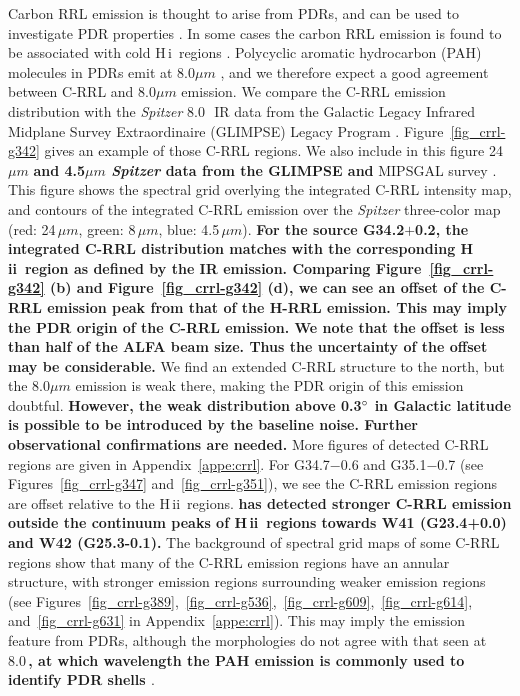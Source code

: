 \documentclass[manuscript]{aastex61}
\newcommand{\hii}{{\rm H\,}{{\sc ii}}}
\newcommand{\hi}{{\rm H\,}{{\sc i}}}
\newcommand{\um}{\mu m}
\begin{document}
Carbon RRL emission is thought to arise from PDRs, and can be used to investigate PDR properties \citep[][etc.]{Pankonin1977,Natta1994,Roshi2007}.
In some cases the carbon RRL emission is found to be associated with cold \hi\ regions \citep{Roshi2011}.
Polycyclic aromatic hydrocarbon (PAH) molecules in PDRs emit at 8.0$\um$ \citep{Watson2008,Watson2009}, and we therefore expect a good agreement between C-RRL and 8.0$\um$ emission.
We compare the C-RRL emission distribution with the {\it Spitzer} 8.0\,\micron\ IR data from the Galactic Legacy Infrared Midplane Survey Extraordinaire (GLIMPSE) Legacy Program \citep{Benjamin2003,Churchwell2009}.
Figure~\ref{fig_crrl-g342} gives an example of those C-RRL regions.
We also include in this figure 24$\um$ \textbf{and 4.5$\um$ {\it Spitzer} data from the GLIMPSE and} MIPSGAL survey \citep{Carey2009, Gutermuth2015}.
This figure shows the spectral grid overlying the integrated C-RRL intensity map, and contours of the integrated C-RRL emission over the {\it Spitzer} three-color map (red: 24\,$\um$, green: 8\,$\um$, blue: 4.5\,$\um$).
\textbf{
For the source G34.2$+$0.2, the integrated C-RRL distribution matches with the corresponding \hii\ region as defined by the IR emission.
Comparing Figure~\ref{fig_crrl-g342} (b) and Figure~\ref{fig_crrl-g342} (d), we can see an offset of the C-RRL emission peak from that of the H-RRL emission.
This may imply the PDR origin of the C-RRL emission.
We note that the offset is less than half of the ALFA beam size.
Thus the uncertainty of the offset may be considerable.
}
We find an extended C-RRL structure to the north, but the 8.0$\um$ emission is weak there, making the PDR origin of this emission doubtful.
\textbf{
However, the weak distribution above 0.3$\mbox{$^\circ$}$ in Galactic latitude is possible to be introduced by the baseline noise. Further observational confirmations are needed. }
More figures of detected C-RRL regions are given in Appendix~\ref{appe:crrl}.
For G34.7$-$0.6 and G35.1$-$0.7 (see Figures~\ref{fig_crrl-g347} and~\ref{fig_crrl-g351}), we see the C-RRL emission regions are offset relative to the \hii\ regions.
\textbf{\cite{Alves2015} has detected stronger C-RRL emission outside the continuum peaks of \hii\ regions towards W41 (G23.4+0.0) and W42 (G25.3-0.1).} 
The background of spectral grid maps of some C-RRL regions show that many of the C-RRL emission regions have an annular structure, with stronger emission regions surrounding weaker emission regions (see Figures~\ref{fig_crrl-g389},~\ref{fig_crrl-g536},~\ref{fig_crrl-g609},~\ref{fig_crrl-g614}, and~\ref{fig_crrl-g631} in Appendix~\ref{appe:crrl}).
This may imply the emission feature from PDRs, although the morphologies do not agree with that seen at 8.0\,\micron\textbf{, at which wavelength the PAH emission is commonly used to identify PDR shells \citep{Watson2009}}.
\end{document}
